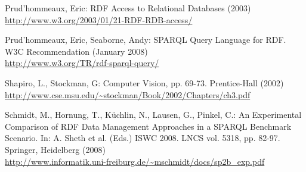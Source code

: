 \documentclass[conference,letterpaper]{IEEEtran}
\begin{document}
\begin{thebibliography}{19}


Prud'hommeaux, Eric:
RDF Access to Relational Databases (2003)\\
\url{http://www.w3.org/2003/01/21-RDF-RDB-access/}

Prud'hommeaux, Eric, Seaborne, Andy:
SPARQL Query Language for RDF. W3C Recommendation (January 2008)\\
\url{http://www.w3.org/TR/rdf-sparql-query/}

Shapiro, L., Stockman, G:
Computer Vision, pp. 69-73. Prentice-Hall (2002)\\
\url{http://www.cse.msu.edu/~stockman/Book/2002/Chapters/ch3.pdf}

Schmidt, M., Hornung, T., K\"{u}chlin, N., Lausen, G., Pinkel, C.:
An Experimental Comparison of RDF Data Management Approaches in a SPARQL
Benchmark Scenario. In: A. Sheth et al. (Eds.) ISWC 2008. LNCS vol.
5318, pp. 82-97. Springer, Heidelberg (2008)\\
\url{http://www.informatik.uni-freiburg.de/~mschmidt/docs/sp2b\_exp.pdf}


\end{thebibliography}
\end{document}
